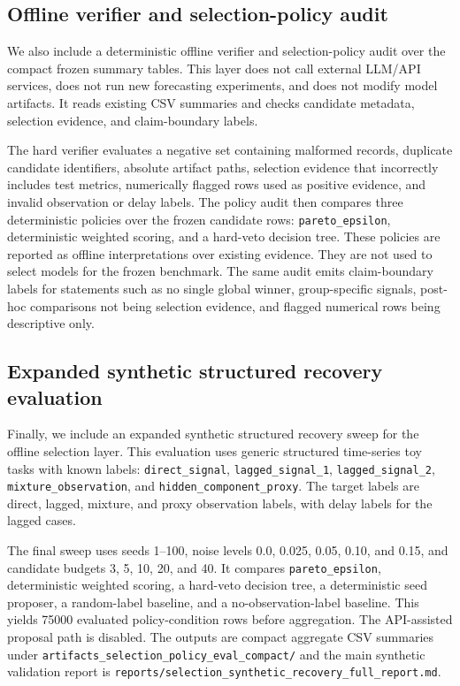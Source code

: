 \subsection{Offline verifier and selection-policy audit}

We also include a deterministic offline verifier and selection-policy audit
over the compact frozen summary tables. This layer does not call external
LLM/API services, does not run new forecasting experiments, and does not
modify model artifacts. It reads existing CSV summaries and checks candidate
metadata, selection evidence, and claim-boundary labels.

The hard verifier evaluates a negative set containing malformed records,
duplicate candidate identifiers, absolute artifact paths, selection evidence
that incorrectly includes test metrics, numerically flagged rows used as
positive evidence, and invalid observation or delay labels. The policy audit
then compares three deterministic policies over the frozen candidate rows:
\texttt{pareto\_epsilon}, deterministic weighted scoring, and a hard-veto
decision tree. These policies are reported as offline interpretations over
existing evidence. They are not used to select models for the frozen
benchmark. The same audit emits claim-boundary labels for statements such as
no single global winner, group-specific signals, post-hoc comparisons not
being selection evidence, and flagged numerical rows being descriptive only.

\subsection{Expanded synthetic structured recovery evaluation}

Finally, we include an expanded synthetic structured recovery sweep for the
offline selection layer. This evaluation uses generic structured time-series
toy tasks with known labels: \texttt{direct\_signal},
\texttt{lagged\_signal\_1}, \texttt{lagged\_signal\_2},
\texttt{mixture\_observation}, and \texttt{hidden\_component\_proxy}. The
target labels are direct, lagged, mixture, and proxy observation labels, with
delay labels for the lagged cases.

The final sweep uses seeds 1--100, noise levels \num{0.0}, \num{0.025},
\num{0.05}, \num{0.10}, and \num{0.15}, and candidate budgets \num{3},
\num{5}, \num{10}, \num{20}, and \num{40}. It compares
\texttt{pareto\_epsilon}, deterministic weighted scoring, a hard-veto
decision tree, a deterministic seed proposer, a random-label baseline, and a
no-observation-label baseline. This yields \num{75000} evaluated
policy-condition rows before aggregation. The API-assisted proposal path is
disabled. The outputs are compact aggregate CSV summaries under
\texttt{artifacts\_selection\_policy\_eval\_compact/} and the main synthetic
validation report is
\texttt{reports/selection\_synthetic\_recovery\_full\_report.md}.

